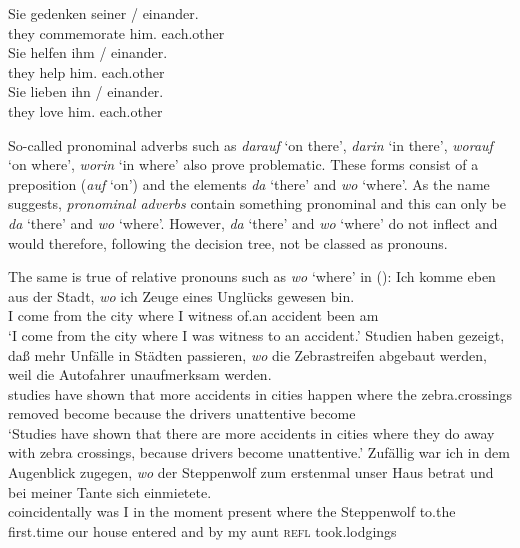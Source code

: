 \eal
\ex 
\gll Sie gedenken seiner / einander.\\
	 they commemorate him.\gen{} {} each.other\\
\ex 
\gll Sie helfen ihm / einander.\\
	 they help him.\dat{} {} each.other\\
\ex 
\gll Sie lieben ihn / einander.\\
	 they love him.\acc{} {} each.other\\
\zl
%

\addlines
So-called pronominal adverbs such as \emph{darauf} `on there', \emph{darin} `in there', \emph{worauf} `on where', \emph{worin} `in where'
also prove problematic. These forms consist of a preposition (\eg \emph{auf} `on') and the elements \emph{da} `there' and \emph{wo} `where'. As the name suggests,
\emph{pronominal adverbs} contain something pronominal and this can only be \emph{da} `there' and
\emph{wo} `where'. However, \emph{da} `there' and \emph{wo} `where'  do not inflect and would therefore,
following the decision tree, not be classed as pronouns.

The same is true of relative pronouns such as \emph{wo} `where' in ():
\eal
\ex 
\gll Ich komme eben aus der Stadt, \emph{wo} ich Zeuge eines Unglücks gewesen bin.\footnotemark\\
	 I come \particle{} from the city where I witness of.an accident been am\\
\label{bsp-wo-ich-zeuge}
\glt `I come from the city where I was witness to an accident.' 
\ex 
\gll Studien haben gezeigt, daß mehr Unfälle in Städten passieren, \emph{wo} die Zebrastreifen abgebaut werden, weil die Autofahrer unaufmerksam werden.\footnotemark\\
     studies have shown that more accidents in cities happen where the zebra.crossings removed become because the drivers unattentive become\\
\glt `Studies have shown that there are more accidents in cities where they do away with zebra crossings, because drivers become unattentive.'
\ex 
\gll Zufällig war ich in dem Augenblick zugegen, \emph{wo} der Steppenwolf zum erstenmal unser Haus betrat und bei meiner Tante sich einmietete.\footnotemark\\
	 coincidentally was I in the moment present where the Steppenwolf to.the first.time our house entered and by my aunt \textsc{refl} took.lodgings\\

